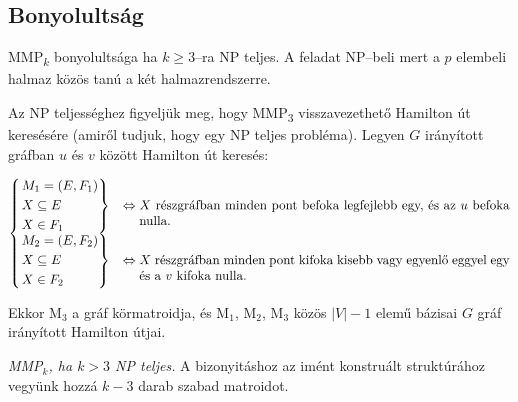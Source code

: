 \subsection{Bonyolultság}

MMP\textsubscript{$k$} bonyolultsága ha $k \geq 3$--ra NP teljes. A feladat
NP--beli mert a $p$ elembeli halmaz közös tanú a két halmazrendszerre.

Az NP teljességhez figyeljük meg, hogy MMP\textsubscript{$3$} visszavezethető
Hamilton út keresésére (amiről tudjuk, hogy egy NP teljes probléma). Legyen $G$
irányított gráfban $u$ és $v$ között Hamilton út keresés:

\[
	\begin{cases}
		\begin{rcases}
			M_1=(E,F_1)   \\
			X \subseteq E \\
			X \in F_1
		\end{rcases} & \Leftrightarrow \parbox[t]{10cm} {$X$ részgráfban minden pont
		befoka legfejlebb egy, és az $u$ befoka nulla.}                              \\
		\begin{rcases}
			M_2=(E,F_2)   \\
			X \subseteq E \\
			X \in F_2
		\end{rcases} & \Leftrightarrow \parbox[t]{10cm} {$X$ részgráfban minden pont
			kifoka kisebb vagy egyenlő eggyel egy és a $v$ kifoka nulla.}
	\end{cases}
\]

Ekkor M$_3$  a gráf körmatroidja, és M$_1$, M$_2$, M$_3$ közös $|V|-1$ elemű
bázisai $G$ gráf irányított Hamilton útjai.

\vspace{0.4cm}
\emph{MMP$_k$, ha $k>3$ NP teljes.}
A bizonyitáshoz az imént konstruált struktúrához vegyünk hozzá $k-3$ darab
szabad matroidot.

